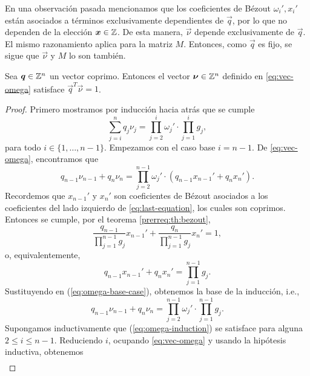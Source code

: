 En una observación pasada mencionamos que los coeficientes de Bézout $\omega_i', x_i'$ están
asociados a términos exclusivamente dependientes de $\vec{q}$, por lo que no dependen de la elección
$\boldsymbol{x} \in \mathbb{Z}$. De esta manera, $\vec{\nu}$ depende exclusivamente de $\vec{q}$. El mismo
razonamiento aplica para la matriz $M$. Entonces, como $\vec{q}$ es fijo, se sigue que
$\vec{\nu}$ y $M$ lo son también.

\begin{lemma} \label{lemma:iso1}
	Sea $\boldsymbol{q} \in \mathbb{Z}^{n}$ un vector coprimo. Entonces el vector $\boldsymbol{\nu}
	\in \mathbb{Z}^n$ definido en \eqref{eq:vec-omega} satisface $\vec{q}^T\vec{\nu} =
	1$.
\end{lemma}
\begin{proof}
	Primero mostramos por inducción hacia atrás que se cumple
	\begin{equation}
		\label{eq:omega-induction} \sum_{j=i}^{n}q_j\nu_j =
		\prod_{j=2}^{i}\omega_j' \cdot \prod_{j=1}^{i}g_j,
	\end{equation}
	para todo $i \in \lbrace 1, \ldots, n - 1\rbrace$. Empezamos con el caso base $i = n - 1$. De
	\eqref{eq:vec-omega}, encontramos que
	\begin{equation}
		\label{eq:omega-base-case}
		q_{n-1}\nu_{n-1} + q_n\nu_n =
		\prod_{j=2}^{n-1}\omega_j' \cdot \left(q_{n-1}x_{n-1}' + q_nx_n'\right).
	\end{equation}
	Recordemos que $x_{n-1}'$ y $x_n'$ son coeficientes de Bézout asociados a los coeficientes del
	lado izquierdo de \eqref{eq:last-equation}, los cuales son coprimos. Entonces se cumple, por el
	teorema \ref{prerreq:th:bezout},
	\begin{equation*}
		\frac{q_{n-1}}{\prod_{j=1}^{n-1}g_j}x_{n-1}' +
		\frac{q_n}{\prod_{j=1}^{n-1}g_j}x_n' = 1,
	\end{equation*}
	o, equivalentemente,
	\begin{equation*}
		q_{n-1}x_{n-1}' + q_nx_n' = \prod_{j=1}^{n-1}g_j.
	\end{equation*}
	Sustituyendo en (\ref{eq:omega-base-case}), obtenemos la base de la inducción, i.e.,
	\begin{equation*}
		q_{n-1}\nu_{n-1} + q_n\nu_n  =
		\prod_{j=2}^{n-1}\omega_j' \cdot \prod_{j=1}^{n-1}g_j.
	\end{equation*}
	Supongamos inductivamente que (\ref{eq:omega-induction}) se satisface para alguna $2 \leq i \leq
	n - 1$. Reduciendo $i$, ocupando \eqref{eq:vec-omega} y usando la hipótesis inductiva,
	obtenemos
	\begin{align*}

\end{align*}
\end{proof}
